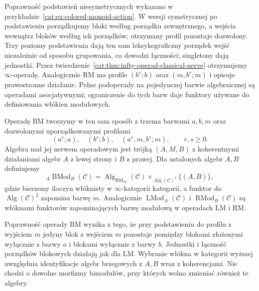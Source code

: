 Poprawność podstawień niesymetrycznych wykazano w przykładzie~\ref{cat:ex:colored-monoid-action}. W wersji symetrycznej po podstawieniu porządkujemy bloki według porządku zewnętrznego, a wejścia wewnątrz bloków według ich porządków; otrzymany profil pozostaje dozwolony. Trzy poziomy podstawienia dają ten sam leksykograficzny porządek wejść niezależnie od sposobu grupowania, co dowodzi łączności; singletony dają jednostki. Przez twierdzenie~\ref{cat:thm:infty-operad-classical-nerve} otrzymujemy $\infty$-operadę. Analogicznie $\mathrm{RM}$ ma profile $(b^r;b)$ oraz $(m,b^r;m)$ i opisuje prawostronne działanie. Pełne podoperady na pojedynczej barwie algebraicznej są operadami asocjatywnymi; ograniczenie do tych barw daje funktory używane do definiowania włókien modułowych.

\begin{definicja}\label{cat:def:infty-bimodule-operad}
Operadę $\mathrm{BM}$ tworzymy w ten sam sposób z trzema barwami $a,b,m$ oraz dozwolonymi uporządkowanymi profilami
\[
 (a^r;a),\quad (b^s;b),\quad(a^r,m,b^s;m),
 \qquad r,s\geq0.
\]
Algebra nad jej nerwem operadowym jest trójką $(A,M,B)$ z koherentnymi działaniami algebr $A$ z lewej strony i $B$ z prawej. Dla ustalonych algebr $A,B$ definiujemy
\[
 {}_A\operatorname{BMod}_B(\mathcal C)
 =
 \operatorname{Alg}_{\mathrm{BM}_\infty}(\mathcal C)
 \times_{\operatorname{Alg}(\mathcal C)^2}\{(A,B)\},
\]
gdzie bierzemy iloczyn włóknisty w $\infty$-kategorii kategorii, a funktor do $\operatorname{Alg}(\mathcal C)^2$ zapomina barwę $m$. Analogicznie $\operatorname{LMod}_A(\mathcal C)$ i $\operatorname{RMod}_B(\mathcal C)$ są włóknami funktorów zapominających barwę modułową w operadach $\mathrm{LM}$ i $\mathrm{RM}$.
\end{definicja}

Poprawność operady $\mathrm{BM}$ wynika z tego, że przy podstawieniu do profilu z wyjściem $m$ jedyny blok z wejściem $m$ pozostaje pomiędzy blokami złożonymi wyłącznie z barwy $a$ i blokami wyłącznie z barwy $b$. Jednostki i łączność porządków blokowych działają jak dla $\mathrm{LM}$. Wybranie włókna w kategorii wyższej uwzględnia identyfikacje algebr brzegowych z $A,B$ wraz z koherencjami. Nie chodzi o dowolne morfizmy bimodułów, przy których wolno zmieniać również te algebry.

